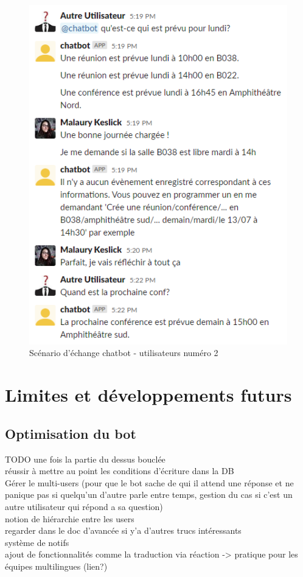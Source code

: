 \documentclass[stage2a]{tnreport} %
\begin{document}
\begin{figure}[H]
    \centering
    \includegraphics{figures/scenario2.PNG}
    \caption{Scénario d'échange chatbot - utilisateurs numéro 2}
    \label{sc2}
\end{figure}

\section{Limites et développements futurs}

\subsection{Optimisation du bot}
TODO une fois la partie du dessus bouclée\\
réussir à mettre au point les conditions d'écriture dans la DB \\
Gérer le multi-users (pour que le bot sache de qui il attend une réponse et ne panique pas si quelqu'un d'autre parle entre temps, gestion du cas si c'est un autre utilisateur qui répond a sa question)\\
notion de hiérarchie entre les users\\
regarder dans le doc d'avancée si y'a d'autres trucs intéressants\\
système de notifs \\
ajout de fonctionnalités comme la traduction via réaction -> pratique pour les équipes multilingues (lien?)\\
\end{document}
